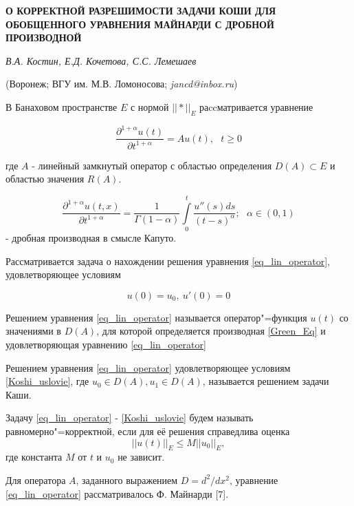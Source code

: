
\begin{center}
    {\bf О КОРРЕКТНОЙ РАЗРЕШИМОСТИ ЗАДАЧИ КОШИ ДЛЯ ОБОБЩЕННОГО УРАВНЕНИЯ МАЙНАРДИ С ДРОБНОЙ ПРОИЗВОДНОЙ}

    {\it В.А. Костин, Е.Д. Кочетова, С.С. Лемешаев}

    (Воронеж; ВГУ им. М.В. Ломоносова; {\it jancd@inbox.ru})
\end{center}



В Банаховом пространстве $E$ с нормой $||*||_E$ раccматривается уравнение

\begin{equation}\label{eq_lin_operator}
	\frac{\partial^{1+\alpha} u(t)}{\partial t^{1+\alpha}} = Au(t), \ \ \ t \geqslant 0
\end{equation}

где $A$ - линейный замкнутый оператор с областью определения $D(A) \subset E$ и областью значения $R(A)$.

\begin{equation}\label{Green_Eq}
        \frac{\partial^{1+\alpha}u(t,x)}{\partial t^{1+\alpha}} = \frac{1}{\Gamma(1-\alpha)} \int\limits_0^t \frac{u''(s)ds}{(t - s)^{\alpha}}; \ \ \ \alpha \in (0, 1)
\end{equation}
 - дробная производная в смысле Капуто.
\vspace{3mm}


Рассматривается задача о нахождении решения уравнения \ref{eq_lin_operator}, удовлетворяющее условиям

\begin{equation}\label{Koshi_uslovie}
	u(0) = u_0, \ u'(0) = 0
\end{equation}

\begin{definition}
	Решением уравнения \ref{eq_lin_operator} называется оператор"=функция $u(t)$ со значениями в $D(A)$, для которой определяется производная \ref{Green_Eq} и удовлетворяющая уравнению \ref{eq_lin_operator}
\end{definition}

\begin{definition}
	Решением уравнения \ref{eq_lin_operator} удовлетворяющее условиям \ref{Koshi_uslovie}, где $u_0 \in D(A), u_1 \in D(A)$, называется решением задачи Каши.
\end{definition}

\begin{definition}
	Задачу \ref{eq_lin_operator} - \ref{Koshi_uslovie} будем называть равномерно"=корректной, если для её решения справедлива оценка
	\begin{equation}\label{ocenka}
		||u(t)||_E \leq M||u_0||_E,
	\end{equation}
	где константа $M$ от $t$ и $u_0$ не зависит.
\end{definition}
Для оператора $A$, заданного выражением $D=d^2/dx^2$, уравнение \ref{eq_lin_operator} рассматривалось Ф. Майнарди [7].
\vspace{3mm}


